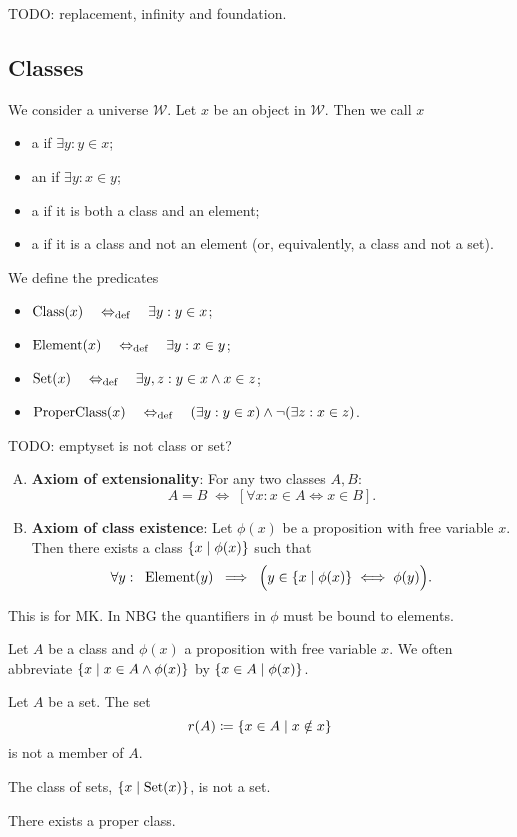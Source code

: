 TODO: replacement, infinity and foundation.

\subsection{Classes}
\begin{definition}
We consider a universe $\mathcal{W}$. Let $x$ be an object in $\mathcal{W}$. Then we call $x$
\begin{itemize}
\item a  if $\exists y: y\in x$;
\item an  if $\exists y: x\in y$;
\item a  if it is both a class and an element;
\item a  if it is a class and not an element (or, equivalently, a class and not a set).
\end{itemize}
We define the predicates
\begin{itemize}
\item $\operatorname{Class}(x) \quad\Leftrightarrow_{\text{def}}\quad \exists y: y\in x$;
\item $\operatorname{Element}(x) \quad\Leftrightarrow_{\text{def}}\quad \exists y: x\in y$;
\item $\operatorname{Set}(x) \quad\Leftrightarrow_{\text{def}}\quad \exists y,z: y\in x \land x\in z$;
\item $\operatorname{ProperClass}(x) \quad\Leftrightarrow_{\text{def}}\quad (\exists y: y \in x)\land \neg (\exists z: x\in z)$.
\end{itemize}
\end{definition}

TODO: emptyset is not class or set?

\begin{enumerate}[(A)]
\item \textbf{Axiom of extensionality}: For any two classes $A,B$:
\[ A=B \;\iff\; \left[\forall x:x\in A\iff x\in B\right]. \]
\item \textbf{Axiom of class existence}: Let $\phi(x)$ be a proposition with free variable $x$. Then there exists a class $\left\{ x \;\middle|\; \phi(x) \right\}$ such that
\[ \forall y: \;\; \operatorname{Element}(y) \;\implies\; \Big( y\in \left\{ x \;\middle|\; \phi(x) \right\} \iff \phi(y) \Big). \]
\end{enumerate}
This is for MK. In NBG the quantifiers in $\phi$ must be bound to elements.

Let $A$ be a class and $\phi(x)$ a proposition with free variable $x$. We often abbreviate $\left\{ x \;\middle|\; x\in A \land \phi(x) \right\}$ by $\left\{ x\in A \;\middle|\; \phi(x) \right\}$.


\begin{proposition} \label{russelParadox}
Let $A$ be a set. The set
\[ r(A) \coloneqq \left\{ x\in A \;\middle|\;  x\notin x  \right\} \]
is not a member of $A$.
\end{proposition}
\begin{corollary} \label{setOfSets}
The class of sets, $\left\{ x \;\middle|\; \operatorname{Set}(x) \right\}$, is not a set.
\end{corollary}
\begin{corollary} \label{properClassExistence}
There exists a proper class.
\end{corollary}



